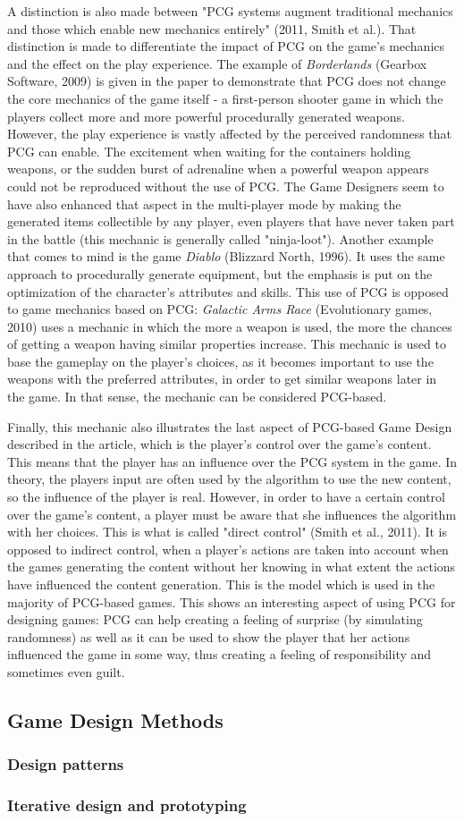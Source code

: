 A distinction is also made between "PCG systems augment traditional mechanics and those which enable new mechanics entirely" (2011, Smith et al.). That distinction is made to differentiate the impact of PCG on the game's mechanics and the effect on the play experience. The example of \textit{Borderlands} (Gearbox Software, 2009)\cite{game:border} is given in the paper to demonstrate that PCG does not change the core mechanics of the game itself - a first-person shooter game in which the players collect more and more powerful procedurally generated weapons. However, the play experience is vastly affected by the perceived randomness that PCG can enable. The excitement when waiting for the containers holding weapons, or the sudden burst of adrenaline when a powerful weapon appears could not be reproduced without the use of PCG. The Game Designers seem to have also enhanced that aspect in the multi-player mode by making the generated items collectible by any player, even players that have never taken part in the battle (this mechanic is generally called "ninja-loot"). Another example that comes to mind is the game \textit{Diablo} (Blizzard North, 1996)\cite{game:diablo}. It uses the same approach to procedurally generate equipment, but the emphasis is put on the optimization of the character's attributes and skills. This use of PCG is opposed to game mechanics based on PCG: \textit{Galactic Arms Race} (Evolutionary games, 2010)\cite{game:gar} uses a mechanic in which the more a weapon is used, the more the chances of getting a weapon having similar properties increase. This mechanic is used to base the gameplay on the player's choices, as it becomes important to use the weapons with the preferred attributes, in order to get similar weapons later in the game. In that sense, the mechanic can be considered PCG-based.

Finally, this mechanic also illustrates the last aspect of PCG-based Game Design described in the article, which is the player's control over the game's content. This means that the player has an influence over the PCG system in the game. In theory, the players input are often used by the algorithm to use the new content, so the influence of the player is real. However, in order to have a certain control over the game's content, a player must be aware that she influences the algorithm with her choices. This is what is called "direct control" (Smith et al., 2011). It is opposed to indirect control, when a player's actions are taken into account when the games generating the content without her knowing in what extent the actions have influenced the content generation. This is the model which is used in the majority of PCG-based games. This shows an interesting aspect of using PCG for designing games: PCG can help creating a feeling of surprise (by simulating randomness) as well as it can be used to show the player that her actions influenced the game in some way, thus creating a feeling of responsibility and sometimes even guilt.

\subsection{Game Design Methods}
\subsubsection{Design patterns}
\subsubsection{Iterative design and prototyping}
